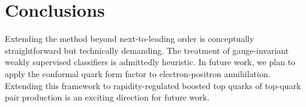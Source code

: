 \section{Conclusions}\label{sec:conclusions}

Extending the method beyond next-to-leading order is conceptually
straightforward but technically demanding. The treatment of
gauge-invariant weakly supervised classifiers is admittedly heuristic.
In future work, we plan to apply the conformal quark form factor to
electron-positron annihilation. Extending this framework to
rapidity-regulated boosted top quarks of top-quark pair production is an
exciting direction for future work.

